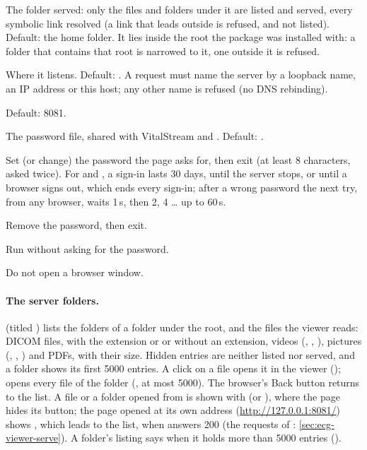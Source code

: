 \begin{params}
\item[--root DIR] The folder served: only the files and folders under it are listed and served,
  every symbolic link resolved (a link that leads outside is refused, and not listed). Default:
  the home folder. It lies inside the root the package was installed with: a folder that
  contains that root is narrowed to it, one outside it is refused.
\item[--host HOST] Where it listens. Default: . A request must name the server
  by a loopback name, an IP address or this host; any other name is refused (no DNS rebinding).
\item[--port N] Default: 8081.
\item[--auth-file FILE] The password file, shared with VitalStream and .
  Default: .
\item[--set-password] Set (or change) the password the page asks for, then exit (at least 8
  characters, asked twice). For  and , a sign-in lasts 30
  days, until the server stops, or until a browser signs out, which ends every sign-in; after a
  wrong password the next try, from any browser, waits 1\,s, then 2, 4 \dots{} up to 60\,s.
\item[--clear-password] Remove the password, then exit.
\item[--no-auth] Run without asking for the password.
\item[--no-browser] Do not open a browser window.
\end{params}

\paragraph{The server folders.}  (titled ) lists the
folders of a folder under the root, and the files the viewer reads: DICOM files, with the
extension  or  or without an extension, videos (,
, ), pictures (, , ) and PDFs, with their
size. Hidden entries are neither listed nor served, and a folder shows its first 5000 entries. A
click on a file opens it in the viewer ();  opens every file of the folder (, at most 5000). The browser's
Back button returns to the list. A file or a folder opened from  is shown with
 (or ), where the page hides its  button; the
page opened at its own address (\url{http://127.0.0.1:8081/}) shows ,
which leads to the list, when  answers 200 
(the requests of : \cref{sec:ecg-viewer-serve}). A folder's listing says when it
holds more than 5000 entries ().

